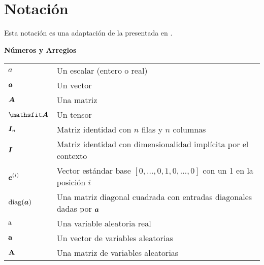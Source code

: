 \chapter*{Notación}
\label{cha:notation}



\vspace{\notationgap}
{\begin{center} \large Esta notación es una adaptación de la presentada en \cite{deeplearning}.\end{center}}

\begin{minipage}{\textwidth}
  
\centerline{\bf Números y Arreglos}
\bgroup
\def\arraystretch{1.5}
\begin{tabular}{>{\centering}m{} p{}}
$\displaystyle a$ & Un escalar (entero o real)\\
$\displaystyle {\bm{a}}$ & Un vector\\
$\displaystyle {\bm{A}}$ & Una matriz\\
$\displaystyle \tA$ & Un tensor\\
$\displaystyle {\bm{I}}_n$ & Matriz identidad con $n$ filas y $n$ columnas\\
$\displaystyle {\bm{I}}$ & Matriz identidad con dimensionalidad implícita por el contexto\\
$\displaystyle {\bm{e}}^{(i)}$ & Vector estándar base $[0,\dots,0,1,0,\dots,0]$ con un 1 en la posición $i$\\
$\displaystyle \mathrm{diag}({\bm{a}})$ & Una matriz diagonal cuadrada con entradas diagonales dadas por ${\bm{a}}$\\
$\displaystyle {\textnormal{a}}$ & Una variable aleatoria real\\
$\displaystyle {\mathbf{a}}$ & Un vector de variables aleatorias\\
$\displaystyle {\mathbf{A}}$ & Una matriz de variables aleatorias\\
\end{tabular}
\egroup
{}
\end{minipage}

